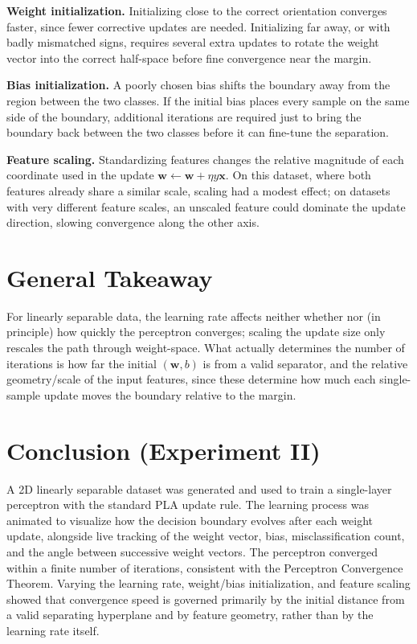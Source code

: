 \documentclass[12pt]{article}
\begin{document}
\textbf{Weight initialization.} Initializing close to the correct orientation converges faster, since fewer corrective updates are needed. Initializing far away, or with badly mismatched signs, requires several extra updates to rotate the weight vector into the correct half-space before fine convergence near the margin.

\textbf{Bias initialization.} A poorly chosen bias shifts the boundary away from the region between the two classes. If the initial bias places every sample on the same side of the boundary, additional iterations are required just to bring the boundary back between the two classes before it can fine-tune the separation.

\textbf{Feature scaling.} Standardizing features changes the relative magnitude of each coordinate used in the update $\mathbf{w} \leftarrow \mathbf{w} + \eta y \mathbf{x}$. On this dataset, where both features already share a similar scale, scaling had a modest effect; on datasets with very different feature scales, an unscaled feature could dominate the update direction, slowing convergence along the other axis.

\section{General Takeaway}

For linearly separable data, the learning rate affects neither whether nor (in principle) how quickly the perceptron converges; scaling the update size only rescales the path through weight-space. What actually determines the number of iterations is how far the initial $(\mathbf{w}, b)$ is from a valid separator, and the relative geometry/scale of the input features, since these determine how much each single-sample update moves the boundary relative to the margin.

\section{Conclusion (Experiment II)}

A 2D linearly separable dataset was generated and used to train a single-layer perceptron with the standard PLA update rule. The learning process was animated to visualize how the decision boundary evolves after each weight update, alongside live tracking of the weight vector, bias, misclassification count, and the angle between successive weight vectors. The perceptron converged within a finite number of iterations, consistent with the Perceptron Convergence Theorem. Varying the learning rate, weight/bias initialization, and feature scaling showed that convergence speed is governed primarily by the initial distance from a valid separating hyperplane and by feature geometry, rather than by the learning rate itself.
\end{document}
